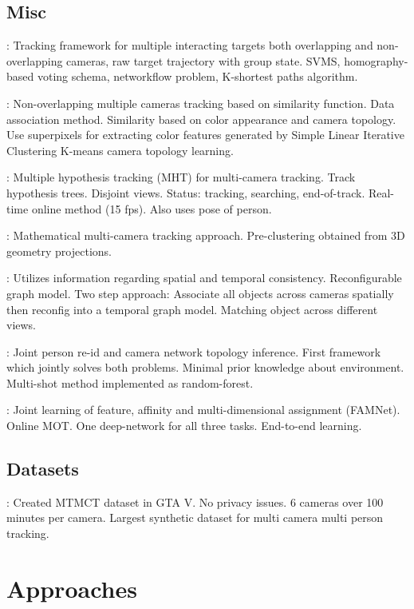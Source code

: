\subsection{Misc}

\cite{Zhang15a}: Tracking framework for multiple interacting targets both overlapping and non-overlapping cameras, raw target trajectory with group state. SVMS, homography-based voting schema, networkflow problem, K-shortest paths algorithm.

\cite{Choi16}: Non-overlapping multiple cameras tracking based on similarity function. Data association method. Similarity based on color appearance and camera topology. Use superpixels for extracting color features generated by Simple Linear Iterative Clustering K-means camera topology learning.

\cite{Yoon18}: Multiple hypothesis tracking (MHT) for multi-camera tracking. Track hypothesis trees. Disjoint views. Status: tracking, searching, end-of-track. Real-time online method (15 fps). Also uses pose of person.

\cite{Nguyen22a}: Mathematical multi-camera tracking approach. Pre-clustering obtained from 3D geometry projections.

\cite{Cheng23}: Utilizes information regarding spatial and temporal consistency. Reconfigurable graph model. Two step approach: Associate all objects across cameras spatially then reconfig into a temporal graph model. Matching object across different views.

\cite{Cho19}: Joint person re-id and camera network topology inference. First framework which jointly solves both problems. Minimal prior knowledge about environment. Multi-shot method implemented as random-forest.

\cite{Chu19}: Joint learning of feature, affinity and multi-dimensional assignment (FAMNet). Online MOT. One deep-network for all three tasks. End-to-end learning.

\subsection{Datasets}

\cite{Koehl20}: Created MTMCT dataset in GTA V. No privacy issues. 6 cameras over 100 minutes per camera. Largest synthetic dataset for multi camera multi person tracking.

\section{Approaches}

